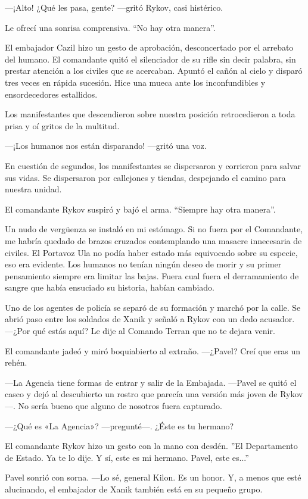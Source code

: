 —¡Alto! ¿Qué les pasa, gente? —gritó Rykov, casi histérico.

Le ofrecí una sonrisa comprensiva. ``No hay otra manera''.

El embajador Cazil hizo un gesto de aprobación, desconcertado por el arrebato del humano. El comandante quitó el silenciador de su rifle sin decir palabra, sin prestar atención a los civiles que se acercaban. Apuntó el cañón al cielo y disparó tres veces en rápida sucesión. Hice una mueca ante los inconfundibles y ensordecedores estallidos.

Los manifestantes que descendieron sobre nuestra posición retrocedieron a toda prisa y oí gritos de la multitud.

—¡Los humanos nos están disparando! —gritó una voz.

En cuestión de segundos, los manifestantes se dispersaron y corrieron para salvar sus vidas. Se dispersaron por callejones y tiendas, despejando el camino para nuestra unidad.

El comandante Rykov suspiró y bajó el arma. ``Siempre hay otra manera''.

Un nudo de vergüenza se instaló en mi estómago. Si no fuera por el Comandante, me habría quedado de brazos cruzados contemplando una masacre innecesaria de civiles. El Portavoz Ula no podía haber estado más equivocado sobre su especie, eso era evidente. Los humanos no tenían ningún deseo de morir y su primer pensamiento siempre era limitar las bajas. Fuera cual fuera el derramamiento de sangre que había ensuciado su historia, habían cambiado.

Uno de los agentes de policía se separó de su formación y marchó por la calle. Se abrió paso entre los soldados de Xanik y señaló a Rykov con un dedo acusador. —¿Por qué estás aquí? Le dije al Comando Terran que no te dejara venir.

El comandante jadeó y miró boquiabierto al extraño. —¿Pavel? Creí que eras un rehén.

—La Agencia tiene formas de entrar y salir de la Embajada. —Pavel se quitó el casco y dejó al descubierto un rostro que parecía una versión más joven de Rykov—. No sería bueno que alguno de nosotros fuera capturado.

—¿Qué es «La Agencia»? —pregunté—. ¿Éste es tu hermano?

El comandante Rykov hizo un gesto con la mano con desdén. ''El Departamento de Estado. Ya te lo dije. Y sí, este es mi hermano. Pavel, este es...''

Pavel sonrió con sorna. —Lo sé, general Kilon. Es un honor. Y, a menos que esté alucinando, el embajador de Xanik también está en su pequeño grupo.

